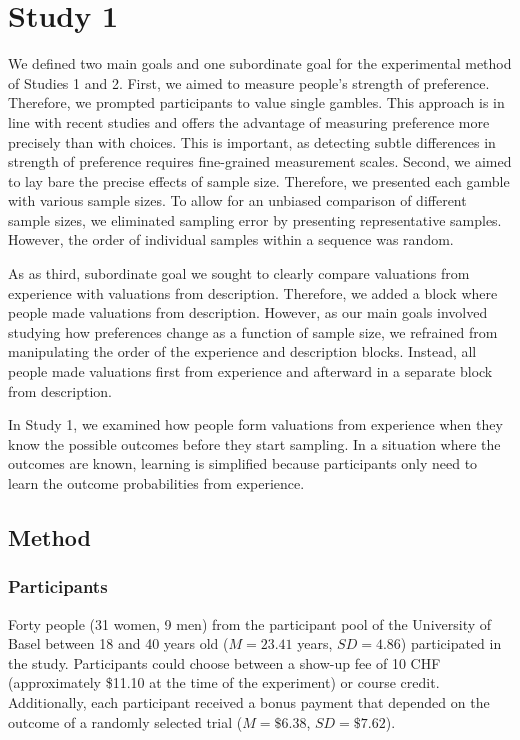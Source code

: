 \documentclass[a4paper, man, natbib, floatsintext]{apa6} %
\begin{document}
\section{Study 1}
We defined two main goals and one subordinate goal for the experimental method of Studies 1 and 2. First, we aimed to measure people's strength of preference. Therefore, we prompted participants to value single gambles. This approach is in line with recent studies \citep[e.g.,][]{Ashby2014, Golan2014, Pachur2012} and offers the advantage of measuring preference more precisely than with choices. This is important, as detecting subtle differences in strength of preference requires fine-grained measurement scales. Second, we aimed to lay bare the precise effects of sample size. Therefore, we presented each gamble with various sample sizes. To allow for an unbiased comparison of different sample sizes, we eliminated sampling error by presenting representative samples. However, the order of individual samples within a sequence was random.

As as third, subordinate goal we sought to clearly compare valuations from experience with valuations from description. Therefore, we added a block where people made valuations from description. However, as our main goals involved studying how preferences change as a function of sample size, we refrained from manipulating the order of the experience and description blocks. Instead, all people made valuations first from experience and afterward in a separate block from description. 

In Study 1, we examined how people form valuations from experience when they know the possible outcomes before they start sampling. In a situation where the outcomes are known, learning is simplified because participants only need to learn the outcome probabilities from experience. 

\subsection{Method}
\subsubsection{Participants}
Forty people (31 women, 9 men) from the participant pool of the University of Basel between 18 and 40 years old ($M = 23.41$ years, $SD = 4.86$) participated in the study. Participants could choose between a show-up fee of 10 CHF (approximately \$11.10 at the time of the experiment) or course credit. Additionally, each participant received a bonus payment that depended on the outcome of a randomly selected trial ($M = \$6.38$, $SD = \$7.62$).
\end{document}
